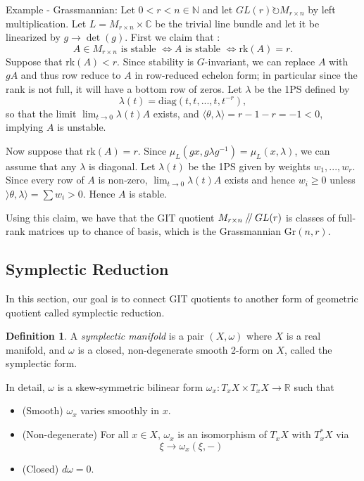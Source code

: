 \documentclass{article}
\theoremstyle{definition}
\newtheorem{definition}[theorem]{Definition}
\theoremstyle{remark}
\numberwithin{theorem}{section}
\newcommand{\C}{\mathbb{C}}
\newcommand{\sslash}{\mathbin{/\mkern-4mu/}}
\newenvironment{defn}{
	\begin{mdframed}
		\vspace{-0.5em}
		\begin{definition}
		}{
		\end{definition}
	\end{mdframed}
}
\begin{document}
	Example - Grassmannian: Let $0<r<n \in\mathbb{N}$ and let $GL(r)\circlearrowright M_{r\times n}$ by left multiplication. Let $L=M_{r\times n}\times \C$ be the trivial line bundle and let it be linearized by $g\to \det(g)$. First we claim that :
 $$A\in M_{r\times n} \text{ is stable } \iff A \text{ is stable } \iff \text{rk}(A)=r.$$
	Suppose that rk$(A)<r$. Since stability is $G$-invariant, we can replace $A$ with $gA$ and thus row reduce to $A$ in row-reduced echelon form; in particular since the rank is not full, it will have a bottom row of zeros. Let $\lambda$ be the 1PS defined by
	$$ \lambda(t) = \text{diag}(t,t,...,t,t^{-r}), $$
	so that the limit $\lim_{t\to 0}\lambda(t) A$ exists, and $\langle \theta, \lambda \rangle = r-1-r = -1 < 0$, implying $A$ is unstable. \vspace{1em}
	
	Now suppose that rk$(A)=r$.  Since $\mu_L(gx, g\lambda g^{-1}) = \mu_L(x,\lambda)$, we can assume that any $\lambda$ is diagonal. Let $\lambda(t)$ be the 1PS given by weights $w_1,...,w_r$. Since every row of $A$ is non-zero, $\lim_{t\to 0}\lambda(t)A$ exists and hence $w_i\geq 0$ unless $\rangle \theta, \lambda \rangle = \sum w_i > 0$. Hence $A$ is stable. \vspace{1em}
	
	Using this claim, we have that the GIT quotient $M_{r\times n}\sslash GL(r)$ is classes of full-rank matrices up to chance of basis, which is the Grassmannian Gr$(n,r)$. 
	
	\pagebreak
	
	\subsection{Symplectic Reduction}
	In this section, our goal is to connect GIT quotients to another form of geometric quotient called symplectic reduction. 
	
	\begin{defn}
		A \emph{symplectic manifold} is a pair $(X,\omega)$ where $X$ is a real manifold, and $\omega$ is a closed, non-degenerate smooth 2-form on $X$, called the symplectic form. \vspace{1em}
		
		In detail, $\omega$ is a skew-symmetric bilinear form $\omega_x:T_xX\times T_xX \to \mathbb{R}$ such that
		\begin{itemize}
			\item (Smooth) $\omega_x$ varies smoothly in $x$.
			\item (Non-degenerate) For all $x\in X$, $\omega_x$ is an isomorphism of $T_xX$ with $T_x^\ast X$ via
			$$\xi \to \omega_x(\xi, -)$$
			\item (Closed) $d\omega =0$.
		\end{itemize}
		\end{defn}
		
\end{document}
